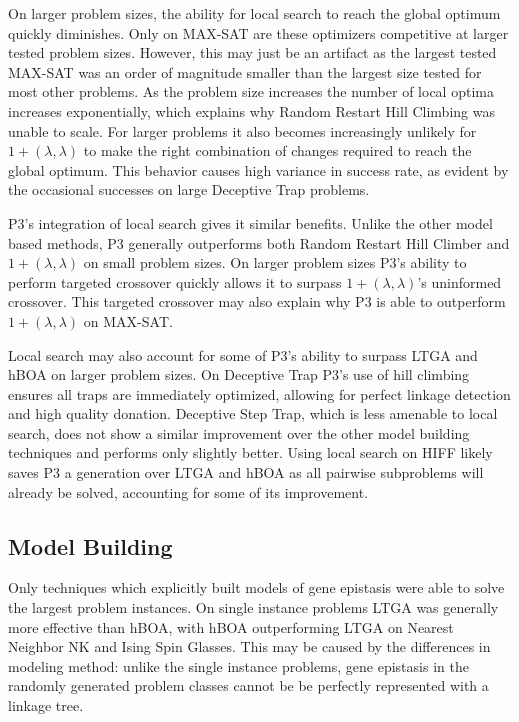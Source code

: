 \documentclass[twoside]{article}
\begin{document}
On larger problem sizes, the ability for local search to reach the global optimum quickly diminishes.
Only on MAX-SAT are these optimizers competitive
at larger tested problem sizes. However, this may just be an artifact as the largest tested MAX-SAT
was an order of magnitude smaller than the largest size tested for most other problems. As the problem
size increases the number of local optima increases exponentially, which explains why Random Restart Hill
Climbing was unable to scale.
For larger problems it also becomes increasingly unlikely for $1+(\lambda, \lambda)$ to make the right combination
of changes required to reach the global optimum. This
behavior causes high variance in success rate, as evident by the occasional successes on large Deceptive Trap problems.

P3's integration of local search gives it similar benefits. Unlike the other model based methods, P3 generally outperforms
both Random Restart Hill Climber and $1+(\lambda, \lambda)$ on small problem sizes. On larger problem sizes
P3's ability to perform targeted crossover quickly allows it to surpass $1+(\lambda, \lambda)$'s uninformed
crossover. This targeted crossover may also explain why P3 is able to outperform $1+(\lambda, \lambda)$ on MAX-SAT.

Local search may also account for some of P3's ability to surpass LTGA and hBOA on larger problem sizes.
On Deceptive Trap P3's use of hill climbing ensures all traps are immediately optimized, allowing for perfect
linkage detection and high quality donation. Deceptive Step Trap, which is less amenable to local search, does
not show a similar improvement over the other model building techniques and performs only slightly better.
Using local search on HIFF likely saves P3 a generation over LTGA and hBOA as all pairwise subproblems will already be solved,
accounting for some of its improvement.

\subsection{Model Building}
Only techniques which explicitly built models of gene epistasis were able to solve the largest problem
instances. On single instance problems LTGA was generally more effective than hBOA, with hBOA outperforming
LTGA on Nearest Neighbor NK and Ising Spin Glasses. This may be caused by the differences in modeling method:
unlike the single instance problems, gene epistasis in the randomly generated
problem classes cannot be be perfectly represented with a linkage tree.
\end{document}
